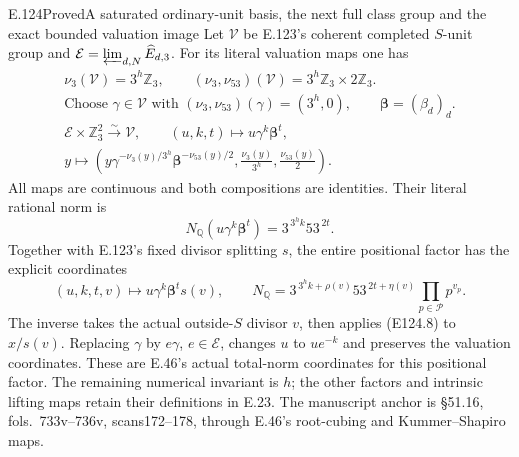 \begin{statement}{E.124}{Proved}{A saturated ordinary-unit basis, the next full class group and the exact bounded valuation image}
Let $\mathcal V$ be E.123's coherent completed $S$-unit group and
$\mathcal E=\varprojlim_{d,N}\widehat E_{d,3}$. For its literal
valuation maps one has
\[
 \begin{gathered}
 \nu_3(\mathcal V)=3^h\mathbb Z_3,\qquad
 (\nu_3,\nu_{53})(\mathcal V)=3^h\mathbb Z_3\times2\mathbb Z_3.\\
 \text{Choose }\gamma\in\mathcal V\text{ with }
 (\nu_3,\nu_{53})(\gamma)=(3^h,0),\qquad
 \boldsymbol\beta=(\beta_d)_d.\\
 \mathcal E\times\mathbb Z_3^2\xrightarrow{\sim}\mathcal V,
 \qquad (u,k,t)\longmapsto u\gamma^k\boldsymbol\beta^t,\\
 y\longmapsto
 \left(y\gamma^{-\nu_3(y)/3^h}\boldsymbol\beta^{-\nu_{53}(y)/2},
       \frac{\nu_3(y)}{3^h},\frac{\nu_{53}(y)}2\right).
 \end{gathered}
 \tag{E124.8}
\]
All maps are continuous and both compositions are identities.
Their literal rational norm is
\[
 N_{\mathbb Q}(u\gamma^k\boldsymbol\beta^t)=3^{\,3^hk}53^{\,2t}.
 \tag{E124.9}
\]
Together with E.123's fixed divisor splitting $s$, the entire
positional factor has the explicit coordinates
\[
 (u,k,t,v)\longmapsto u\gamma^k\boldsymbol\beta^t s(v),\qquad
 N_{\mathbb Q}=3^{\,3^hk+\rho(v)}53^{\,2t+\eta(v)}
                         \prod_{p\in\mathcal P}p^{v_p}.
 \tag{E124.10}
\]
The inverse takes the actual outside-$S$ divisor $v$, then applies
(E124.8) to $x/s(v)$. Replacing $\gamma$ by $e\gamma$,
$e\in\mathcal E$, changes $u$ to $ue^{-k}$ and preserves
the valuation coordinates. These are E.46's actual total-norm
coordinates for this positional factor. The remaining numerical
invariant is $h$; the other factors and intrinsic lifting maps
retain their definitions in E.23. The manuscript anchor is
\S51.16, fols.~733v--736v, scans172--178, through E.46's
root-cubing and Kummer--Shapiro maps.
\end{statement}

